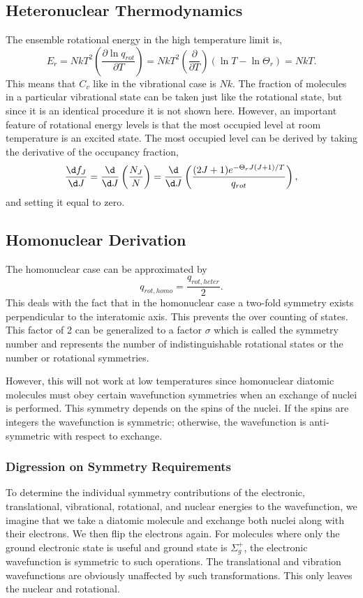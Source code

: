 \subsection{Heteronuclear Thermodynamics}
The ensemble rotational energy in the high temperature limit is,
\begin{equation*}
	E_r = NkT^2 \left(\frac{\partial \ln q_{rot}}{\partial T}\right) = NkT^2
	\left(\frac{\partial}{\partial T}\right) (\ln T - \ln \Theta_r) = NkT.
\end{equation*}
This means that $C_v$ like in the vibrational case is $Nk$. The fraction of
molecules in a particular vibrational state can be taken just like the
rotational state, but since it is an identical procedure it is not shown here.
However, an important feature of rotational energy levels is that the most
occupied level at room temperature is an excited state. The most occupied level
can be derived by taking the derivative of the occupancy fraction,
\begin{equation*}
	\frac{\d f_J}{\d J} = \frac{\d}{\d J}\left(\frac{N_J}{N}\right) =
	\frac{\d}{\d J}\left(\frac{(2J+1)e^{-\Theta_r J(J+1)/T}}{q_{rot}}\right),
\end{equation*}
and setting it equal to zero.

\subsection{Homonuclear Derivation}
\note The homonuclear case can be approximated by
\begin{equation*}
	q_{rot,homo} = \frac{q_{rot,heter}}{2}.
\end{equation*}
This deals with the fact that in the homonuclear case a two-fold symmetry exists
perpendicular to the interatomic axis. This prevents the over counting of states.
This factor of 2 can be generalized to a factor $\sigma$ which is called the
symmetry number and represents the number of indistinguishable rotational states
or the number or rotational symmetries.

However, this will not work at low temperatures since homonuclear diatomic
molecules must obey certain wavefunction symmetries when an exchange of nuclei
is performed. This symmetry depends on the spins of the nuclei. If the spins are
integers the wavefunction is symmetric; otherwise, the wavefunction is
anti-symmetric with respect to exchange.

\subsubsection{Digression on Symmetry Requirements}
To determine the individual symmetry contributions of the electronic,
translational, vibrational, rotational, and nuclear energies to the
wavefunction, we imagine that we take a diatomic molecule and exchange both
nuclei along with their electrons. We then flip the electrons again. For
molecules where only the ground electronic state is useful and ground state is
$\Sigma_g^+$, the electronic wavefunction is symmetric to such operations. The
translational and vibration wavefunctions are obviously unaffected by such
transformations. This only leaves the nuclear and rotational.

